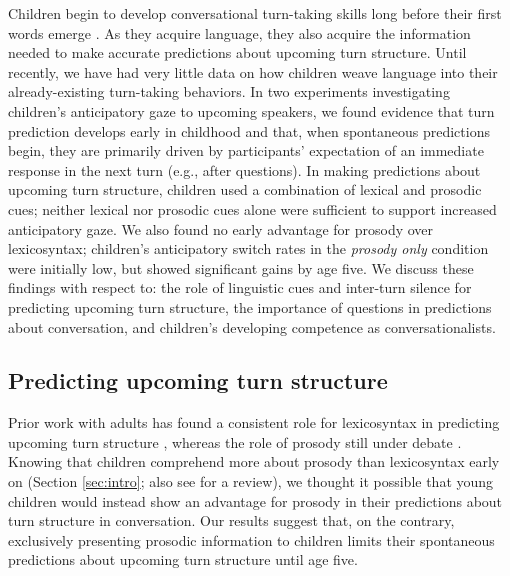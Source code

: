 \documentclass[authoryear, 12pt]{elsarticle}
\begin{document}
Children begin to develop conversational turn-taking skills long before their first words emerge \citep{bateson1975, hilbrink2015, jaffe2001, snow1977}. As they acquire language, they also acquire the information needed to make accurate predictions about upcoming turn structure. Until recently, we have had very little data on how children weave language into their already-existing turn-taking behaviors. In two experiments investigating children's anticipatory gaze to upcoming speakers, we found evidence that turn prediction develops early in childhood and that, when spontaneous predictions begin, they are primarily driven by participants' expectation of an immediate response in the next turn (e.g., after questions). In making predictions about upcoming turn structure, children used a combination of lexical and prosodic cues; neither lexical nor prosodic cues alone were sufficient to support increased anticipatory gaze. We also found no early advantage for prosody over lexicosyntax; children's anticipatory switch rates in the \textit{prosody only} condition were initially low, but showed significant gains by age five. We discuss these findings with respect to: the role of linguistic cues and inter-turn silence for predicting upcoming turn structure, the importance of questions in predictions about conversation, and children's developing competence as conversationalists.

\subsection*{Predicting upcoming turn structure}

Prior work with adults has found a consistent role for lexicosyntax in predicting upcoming turn structure \citep{de-ruiter2006, magyari2012}, whereas the role of prosody still under debate \citep{duncan1972, ford1996, torreira2015}. Knowing that children comprehend more about prosody than lexicosyntax early on (Section \ref{sec:intro}; also see \citealp{speer2009} for a review), we thought it possible that young children would instead show an advantage for prosody in their predictions about turn structure in conversation. Our results suggest that, on the contrary, exclusively presenting prosodic information to children limits their spontaneous predictions about upcoming turn structure until age five.
\end{document}
